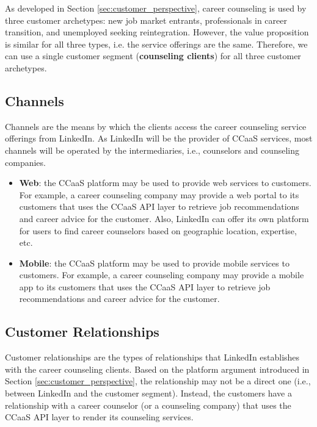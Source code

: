 As developed in Section \ref{sec:customer_perspective}, career counseling is used by three customer archetypes:
new job market entrants, professionals in career transition, and unemployed seeking reintegration. However, the
value proposition is similar for all three types, i.e. the service offerings are the same. Therefore, we can use
a single customer segment (\textbf{counseling clients}) for all three customer archetypes.


\subsection{Channels}

Channels are the means by which the clients access the career counseling service offerings from LinkedIn.
As LinkedIn will be the provider of CCaaS services, most channels will be operated by the intermediaries,
i.e., counselors and counseling companies.

\begin{itemize}
    \item \textbf{Web}: the CCaaS platform may be used to provide web services to customers.
            For example, a career counseling company may provide a web portal to its customers
            that uses the CCaaS API layer to retrieve job recommendations and career advice for
            the customer. Also, LinkedIn can offer its own platform for users to find career
            counselors based on geographic location, expertise, etc.
    \item \textbf{Mobile}: the CCaaS platform may be used to provide mobile services to customers.
            For example, a career counseling company may provide a mobile app to its customers
            that uses the CCaaS API layer to retrieve job recommendations and career advice for
            the customer.
\end{itemize}

\subsection{Customer Relationships}

Customer relationships are the types of relationships that LinkedIn establishes with the career
counseling clients. Based on the platform argument introduced in Section \ref{sec:customer_perspective},
the relationship may not be a direct one (i.e., between LinkedIn and the customer segment). Instead, 
the customers have a relationship with a career counselor (or a counseling company) that uses the
CCaaS API layer to render its counseling services.

